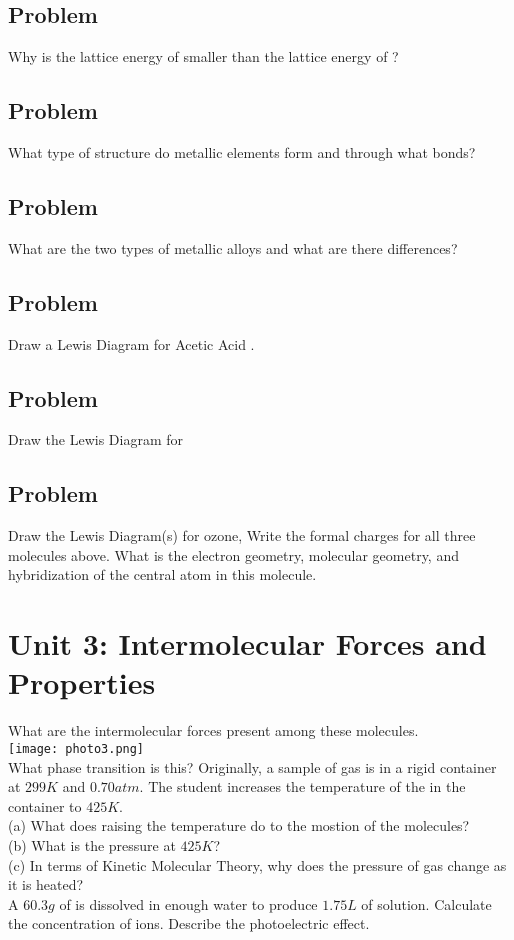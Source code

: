 \documentclass[../main.tex]{subfiles}
\begin{document}
\subsection*{Problem \countThis}
Why is the lattice energy of  smaller than the lattice energy of ?
\subsection*{Problem \countThis}
What type of structure do metallic elements form and through what bonds? 
\subsection*{Problem \countThis}
What are the two types of metallic alloys and what are there differences?
\subsection*{Problem \countThis}
Draw a Lewis Diagram for Acetic Acid .
\subsection*{Problem \countThis}
Draw the Lewis Diagram for 
\subsection*{Problem \countThis}
Draw the Lewis Diagram(s) for ozone, 
\ProblemSet
Write the formal charges for all three molecules above.
\ProblemSet
What is the electron geometry, molecular geometry, and hybridization of the central atom in this molecule. \\ 
\section{Unit 3: Intermolecular Forces and Properties}
\ProblemSet
What are the intermolecular forces present among these molecules. \\ 
\ProblemSet
\texttt{[image: photo3.png]} \\
What phase transition is this?
\ProblemSet
Originally, a sample of gas is in a rigid container at \(299K\) and \(0.70 atm\). The student increases the temperature of the  in the container to \(425K\).\\
(a) What does raising the temperature do to the mostion of the molecules?\\
(b) What is the pressure at \(425K\)?\\
(c) In terms of Kinetic Molecular Theory, why does the pressure of gas change as it is heated? \\
\ProblemSet
A \(60.3g\) of  is dissolved in enough water to produce \(1.75L\) of solution. Calculate the concentration of  ions. 
\ProblemSet
Describe the photoelectric effect. 
\end{document}
